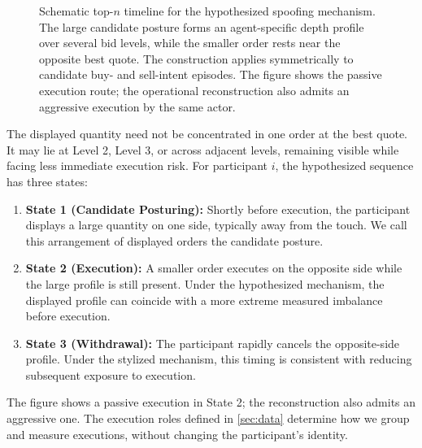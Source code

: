 \documentclass[11pt]{article}
\begin{document}
\begin{figure}[htbp]
{%
    }
    \caption{Schematic top-$n$ timeline for the hypothesized spoofing mechanism. The large candidate posture forms an
    agent-specific depth profile over several bid levels, while the smaller order rests near the opposite best quote. The
    construction applies symmetrically to candidate buy- and sell-intent episodes. The figure shows the passive execution
    route; the operational reconstruction also admits an aggressive execution by the same actor.}
    \label{fig:topn_spoofing_timeline}
\end{figure}
\FloatBarrier

The displayed quantity need not be concentrated in one order at the best quote. It may lie at Level 2, Level 3, or across
adjacent levels, remaining visible while facing less immediate execution risk. For participant $i$, the hypothesized
sequence has three states:
\begin{enumerate}
    \item \textbf{State 1 (Candidate Posturing):} Shortly before execution, the participant displays a large quantity
    on one side, typically away from the touch. We call this arrangement of displayed orders the candidate posture.
    \item \textbf{State 2 (Execution):} A smaller order executes on the opposite side while the large profile is still
    present. Under the hypothesized mechanism, the displayed profile can coincide with a more extreme measured imbalance
    before execution.
    \item \textbf{State 3 (Withdrawal):} The participant rapidly cancels the opposite-side profile. Under the stylized
    mechanism, this timing is consistent with reducing subsequent exposure to execution.
\end{enumerate}

The figure shows a passive execution in State 2; the reconstruction also admits an aggressive one. The execution roles
defined in \cref{sec:data} determine how we group and measure executions, without changing the participant's identity.
\end{document}
